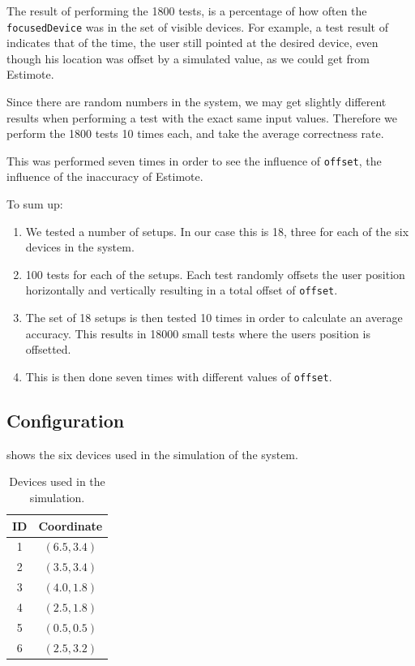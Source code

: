 The result of performing the \num{1800} tests, 
is a percentage of how often the \texttt{focusedDevice} was in the set of visible devices. 
For example, a test result of  indicates that  of the time, 
the user still pointed at the desired device, 
even though his location was offset by a simulated value, 
as we could get from Estimote.

Since there are random numbers in the system, 
we may get slightly different results when performing a test with the exact same input values. 
Therefore we perform the \num{1800} tests \num{10} times each, 
and take the average correctness rate.

This was performed seven times in order to see the influence of \texttt{offset},
\ie the influence of the inaccuracy of Estimote.

To sum up:
\begin{enumerate}
\item We tested a number of setups. In our case this is \num{18}, three for each of the six devices in the system.
\item \num{100} tests for each of the setups. Each test randomly offsets the user position horizontally and vertically resulting in a total offset of \texttt{offset}.
\item The set of \num{18} setups is then tested \num{10} times in order to calculate an average accuracy. This results in \num{18000} small tests where the users position is offsetted.
\item This is then done seven times with different values of \texttt{offset}.
\end{enumerate}

\subsection{Configuration}

 shows the six devices used in the simulation of the system.

\begin{table}[!hbt]
\centering
\caption{Devices used in the simulation.}
\label{tbl:evaluation:system-correctness:devices}
\begin{tabular}{c|c}
	\textbf{ID} & \textbf{Coordinate} \\ \hline
	     1      &    $(6.5, 3.4)$     \\
	     2      &    $(3.5 , 3.4)$    \\
	     3      &    $(4.0 , 1.8)$    \\
	     4      &    $(2.5 , 1.8)$    \\
	     5      &    $(0.5 , 0.5)$    \\
	     6      &    $(2.5 , 3.2)$
\end{tabular}
\end{table}

